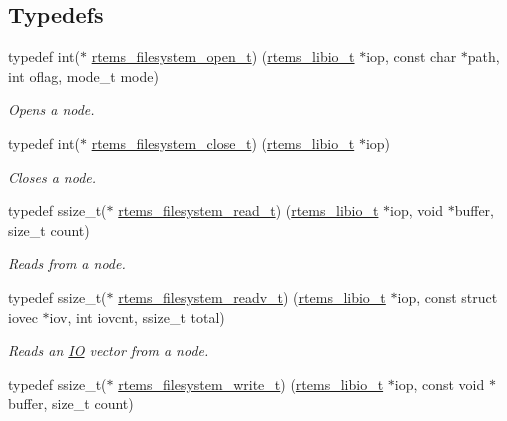\subsection*{Typedefs}
\begin{DoxyCompactItemize}
\item 
typedef int($\ast$ \mbox{\hyperlink{group__LibIOFSHandler_gaf95c211266cc1feef5e53066310f9134}{rtems\+\_\+filesystem\+\_\+open\+\_\+t}}) (\mbox{\hyperlink{structrtems__libio__tt}{rtems\+\_\+libio\+\_\+t}} $\ast$iop, const char $\ast$path, int oflag, mode\+\_\+t mode)
\begin{DoxyCompactList}\small\item\em Opens a node. \end{DoxyCompactList}\item 
typedef int($\ast$ \mbox{\hyperlink{group__LibIOFSHandler_ga9c520e776b733893afba2997e163c8af}{rtems\+\_\+filesystem\+\_\+close\+\_\+t}}) (\mbox{\hyperlink{structrtems__libio__tt}{rtems\+\_\+libio\+\_\+t}} $\ast$iop)
\begin{DoxyCompactList}\small\item\em Closes a node. \end{DoxyCompactList}\item 
typedef ssize\+\_\+t($\ast$ \mbox{\hyperlink{group__LibIOFSHandler_ga36ed9dda6132dd307fc24ce03f730312}{rtems\+\_\+filesystem\+\_\+read\+\_\+t}}) (\mbox{\hyperlink{structrtems__libio__tt}{rtems\+\_\+libio\+\_\+t}} $\ast$iop, void $\ast$buffer, size\+\_\+t count)
\begin{DoxyCompactList}\small\item\em Reads from a node. \end{DoxyCompactList}\item 
typedef ssize\+\_\+t($\ast$ \mbox{\hyperlink{group__LibIOFSHandler_gae6ccf9c319ab60636be036e7437f8dd7}{rtems\+\_\+filesystem\+\_\+readv\+\_\+t}}) (\mbox{\hyperlink{structrtems__libio__tt}{rtems\+\_\+libio\+\_\+t}} $\ast$iop, const struct iovec $\ast$iov, int iovcnt, ssize\+\_\+t total)
\begin{DoxyCompactList}\small\item\em Reads an \mbox{\hyperlink{structIO}{IO}} vector from a node. \end{DoxyCompactList}\item 
typedef ssize\+\_\+t($\ast$ \mbox{\hyperlink{group__LibIOFSHandler_gacbc1d51a1699693e340b3e31f7f62611}{rtems\+\_\+filesystem\+\_\+write\+\_\+t}}) (\mbox{\hyperlink{structrtems__libio__tt}{rtems\+\_\+libio\+\_\+t}} $\ast$iop, const void $\ast$buffer, size\+\_\+t count)

\end{DoxyCompactItemize}
